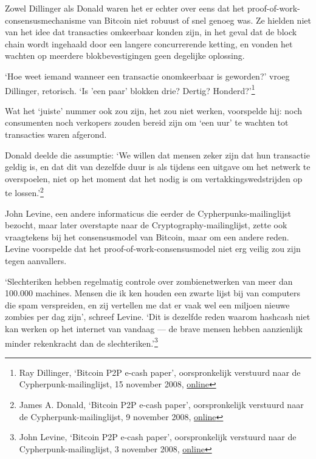 \documentclass[smalldemyvopaper,11pt,twoside,onecolumn,openright,extrafontsizes,hidelinks]{memoir}
\begin{document}
Zowel Dillinger als Donald waren het er echter over eens dat het
proof-of-work-consensusmechanisme van Bitcoin niet robuust of snel
genoeg was. Ze hielden niet van het idee dat transacties omkeerbaar
konden zijn, in het geval dat de block chain wordt ingehaald door een
langere concurrerende ketting, en vonden het wachten op meerdere
blokbevestigingen geen degelijke oplossing.

`Hoe weet iemand wanneer een transactie onomkeerbaar is geworden?' vroeg
Dillinger, retorisch. `Is 'een paar' blokken drie? Dertig?
Honderd?'\footnote{Ray Dillinger, `Bitcoin P2P e-cash paper',
  oorspronkelijk verstuurd naar de Cypherpunk-mailinglijst, 15 november
  2008,
  \href{https://www.metzdowd.com/pipermail/cryptography/2008-November/014859.html}{online}}

Wat het `juiste' nummer ook zou zijn, het zou niet werken, voorspelde
hij: noch consumenten noch verkopers zouden bereid zijn om `een uur' te
wachten tot transacties waren afgerond.

Donald deelde die assumptie: `We willen dat mensen zeker zijn dat hun
transactie geldig is, en dat dit van dezelfde duur is als tijdens een
uitgave om het netwerk te overspoelen, niet op het moment dat het nodig
is om vertakkingswedstrijden op te lossen.'\footnote{James A. Donald,
  `Bitcoin P2P e-cash paper', oorspronkelijk verstuurd naar de
  Cypherpunk-mailinglijst, 9 november 2008,
  \href{https://www.metzdowd.com/pipermail/cryptography/2008-November/014841.html}{online}}

John Levine, een andere informaticus die eerder de
Cypherpunks-mailinglijst bezocht, maar later overstapte naar de
Cryptography-mailinglijst, zette ook vraagtekens bij het consensusmodel
van Bitcoin, maar om een andere reden. Levine voorspelde dat het
proof-of-work-consensusmodel niet erg veilig zou zijn tegen aanvallers.

`Slechteriken hebben regelmatig controle over zombienetwerken van meer
dan 100.000 machines. Mensen die ik ken houden een zwarte lijst bij van
computers die spam verspreiden, en zij vertellen me dat er vaak wel een
miljoen nieuwe zombies per dag zijn', schreef Levine. `Dit is dezelfde
reden waarom hashcash niet kan werken op het internet van vandaag --- de
brave mensen hebben aanzienlijk minder rekenkracht dan de
slechteriken.'\footnote{John Levine, `Bitcoin P2P e-cash paper',
  oorspronkelijk verstuurd naar de Cypherpunk-mailinglijst, 3 november
  2008,
  \href{https://www.metzdowd.com/pipermail/cryptography/2008-November/014817.html}{online}}
\end{document}
